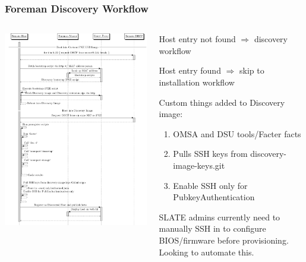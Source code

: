 \documentclass{beamer}
\begin{document}
\begin{frame}[fragile]
 \frametitle{Foreman Discovery Workflow}

 \begin{columns}
  \begin{column}{0.5\textwidth}
   \flushleft
   \includegraphics[width=\textwidth,height=\textheight-15mm,keepaspectratio]{discovery_sd}
  \end{column}

  \begin{column}{0.5\textwidth}
   \small
   Host entry not found $\Rightarrow$ discovery workflow

   Host entry found $\Rightarrow$ skip to installation workflow
   \vspace{.5cm}

   Custom things added to Discovery image:
   \begin{enumerate}
    \item OMSA and DSU tools/Facter facts
    \item Pulls SSH keys from discovery-image-keys.git
    \item Enable SSH only for PubkeyAuthentication
   \end{enumerate}

   SLATE admins currently need to manually SSH in to configure BIOS/firmware before provisioning. Looking to automate this.

  \end{column}
 \end{columns}
\end{frame}
\end{document}
